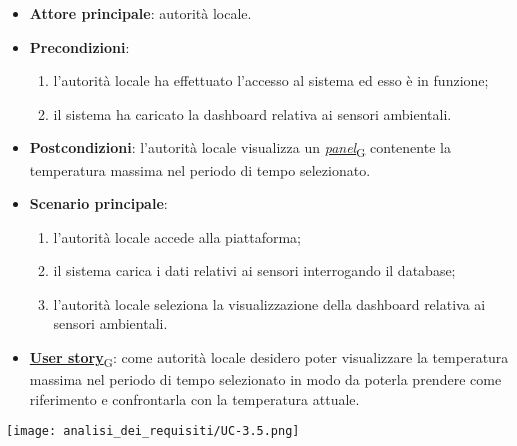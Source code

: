 \begin{itemize}
	\item \textbf{Attore principale}: autorità locale.
	\item \textbf{Precondizioni}:
	      \begin{enumerate}
		      \item l'autorità locale ha effettuato l'accesso al sistema ed esso è in funzione;
		      \item il sistema ha caricato la dashboard relativa ai sensori ambientali.
	      \end{enumerate}
	\item \textbf{Postcondizioni}: l'autorità locale visualizza un \href{https://7last.github.io/docs/rtb/documentazione-interna/glossario\#panel}{\textit{panel}\textsubscript{G}} contenente la temperatura massima nel periodo di tempo selezionato.
	\item \textbf{Scenario principale}:
	      \begin{enumerate}
		      \item l'autorità locale accede alla piattaforma;
		      \item il sistema carica i dati relativi ai sensori interrogando il database;
		      \item l'autorità locale seleziona la visualizzazione della dashboard relativa ai sensori ambientali.
	      \end{enumerate}
	\item \href{https://7last.github.io/docs/rtb/documentazione-interna/glossario\#user-story}{\textbf{User story}\textsubscript{G}}:
	      come autorità locale desidero poter visualizzare la temperatura massima nel periodo di tempo selezionato
	      in modo da poterla prendere come riferimento e confrontarla con la temperatura attuale.
\end{itemize}
\begin{center}
	\texttt{[image: analisi\_dei\_requisiti/UC-3.5.png]}
\end{center}


